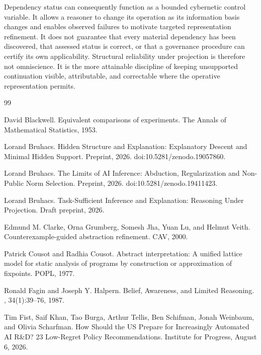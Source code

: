 \documentclass[11pt]{article}
\theoremstyle{definition}
\theoremstyle{remark}
\begin{document}
Dependency status can consequently function as a bounded cybernetic control variable. It allows a reasoner to change its operation as its information basis changes and enables observed failures to motivate targeted representation refinement. It does not guarantee that every material dependency has been discovered, that assessed status is correct, or that a governance procedure can certify its own applicability. Structural reliability under projection is therefore not omniscience. It is the more attainable discipline of keeping unsupported continuation visible, attributable, and correctable where the operative representation permits.

\begin{thebibliography}{99}

David Blackwell.
\newblock Equivalent comparisons of experiments.
\newblock The Annals of Mathematical Statistics, 1953.

Lorand Bruhacs.
\newblock Hidden Structure and Explanation: Explanatory Descent and Minimal Hidden Support.
\newblock Preprint, 2026.
\newblock doi:10.5281/zenodo.19057860.

Lorand Bruhacs.
\newblock The Limits of AI Inference: Abduction, Regularization and Non-Public Norm Selection.
\newblock Preprint, 2026.
\newblock doi:10.5281/zenodo.19411423.

Lorand Bruhacs.
\newblock Task-Sufficient Inference and Explanation: Reasoning Under Projection.
\newblock Draft preprint, 2026.

Edmund M. Clarke, Orna Grumberg, Somesh Jha, Yuan Lu, and Helmut Veith.
\newblock Counterexample-guided abstraction refinement.
\newblock CAV, 2000.

Patrick Cousot and Radhia Cousot.
\newblock Abstract interpretation: A unified lattice model for static analysis of programs by construction or approximation of fixpoints.
\newblock POPL, 1977.

Ronald Fagin and Joseph Y. Halpern.
\newblock Belief, Awareness, and Limited Reasoning.
, 34(1):39--76, 1987.

Tim Fist, Saif Khan, Tao Burga, Arthur Tellis, Ben Schifman, Jonah Weinbaum, and Olivia Scharfman.
\newblock How Should the US Prepare for Increasingly Automated AI R\&D? 23 Low-Regret Policy Recommendations.
\newblock Institute for Progress, August 6, 2026.


\end{thebibliography}
\end{document}
